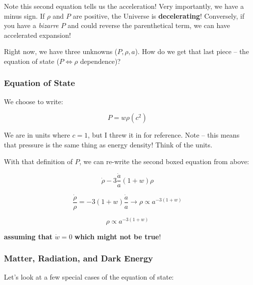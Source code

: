 \documentclass{article}
\begin{document}
Note this second equation tells us the acceleration! Very importantly, we have a minus sign. If $\rho$ and $P$ are positive, the Universe is \textbf{decelerating}! Conversely, if you have a \textit{bizarre} $P$ and could reverse the parenthetical term, we can have accelerated expansion! 


Right now, we have three unknowns ($P, \rho, a$). How do we get that last piece -- the equation of state ($P \iff \rho$ dependence)?

\subsubsection{Equation of State}

We choose to write:

\begin{equation}
    P = w\rho (c^2)
\end{equation}

We are in units where $c = 1$, but I threw it in for reference. Note -- this means that pressure is the same thing as energy density! Think of the units. 

With that definition of $P$, we can re-write the second boxed equation from above:

\begin{equation}
    \dot{\rho} -3\frac{\dot{a}}{a}\left(1+w\right)\rho
\end{equation}

\begin{equation}
    \frac{\dot{\rho}}{\rho} = -3 (1+w) \frac{\dot{a}}{a} \rightarrow \rho \propto a ^{-3(1+w)}
\end{equation}

\begin{equation}
    \boxed{\rho \propto a^{-3\left(1+w\right)}}
\end{equation}

\textbf{assuming that} $\dot{w} =0$ \textbf{which might not be true}!

\subsubsection{Matter, Radiation, and Dark Energy}

Let's look at a few special cases of the equation of state:
\end{document}
